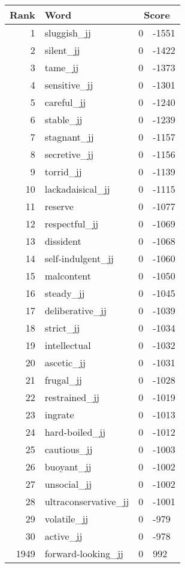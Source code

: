 \begin{longtable}[!htbp]{| rlr@{.}l |}
    \hline
    \textbf{Rank} & \textbf{Word} & \multicolumn{2}{c|}{\textbf{Score}} \\
    \hline
    \endhead
    1 & sluggish\_jj & 0 & -1551 \\
    2 & silent\_jj & 0 & -1422 \\
    3 & tame\_jj & 0 & -1373 \\
    4 & sensitive\_jj & 0 & -1301 \\
    5 & careful\_jj & 0 & -1240 \\
    6 & stable\_jj & 0 & -1239 \\
    7 & stagnant\_jj & 0 & -1157 \\
    8 & secretive\_jj & 0 & -1156 \\
    9 & torrid\_jj & 0 & -1139 \\
    10 & lackadaisical\_jj & 0 & -1115 \\
    11 & reserve & 0 & -1077 \\
    12 & respectful\_jj & 0 & -1069 \\
    13 & dissident & 0 & -1068 \\
    14 & self-indulgent\_jj & 0 & -1060 \\
    15 & malcontent & 0 & -1050 \\
    16 & steady\_jj & 0 & -1045 \\
    17 & deliberative\_jj & 0 & -1039 \\
    18 & strict\_jj & 0 & -1034 \\
    19 & intellectual & 0 & -1032 \\
    20 & ascetic\_jj & 0 & -1031 \\
    21 & frugal\_jj & 0 & -1028 \\
    22 & restrained\_jj & 0 & -1019 \\
    23 & ingrate & 0 & -1013 \\
    24 & hard-boiled\_jj & 0 & -1012 \\
    25 & cautious\_jj & 0 & -1003 \\
    26 & buoyant\_jj & 0 & -1002 \\
    27 & unsocial\_jj & 0 & -1002 \\
    28 & ultraconservative\_jj & 0 & -1001 \\
    29 & volatile\_jj & 0 & -979 \\
    30 & active\_jj & 0 & -978 \\
    1949 & forward-looking\_jj & 0 & 992 \\

\end{longtable}
